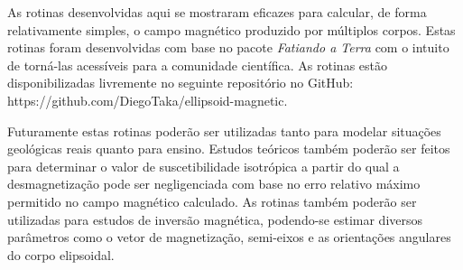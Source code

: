As rotinas desenvolvidas aqui se mostraram eficazes para calcular, de forma relativamente simples, o campo magnético produzido por múltiplos corpos. Estas rotinas foram desenvolvidas com base no pacote \textit{Fatiando a Terra} com o intuito de torná-las acessíveis para a comunidade científica. As rotinas estão disponibilizadas livremente no seguinte repositório no GitHub: https://github.com/DiegoTaka/ellipsoid-magnetic.

Futuramente estas rotinas poderão ser utilizadas tanto para modelar situações geológicas reais quanto para ensino. Estudos teóricos também poderão ser feitos para determinar o valor de suscetibilidade isotrópica a partir do qual a desmagnetização pode ser negligenciada com base no erro relativo máximo permitido no campo magnético calculado. As rotinas também poderão ser utilizadas para estudos de inversão magnética, podendo-se estimar diversos parâmetros como o vetor de magnetização, semi-eixos e as orientações angulares do corpo elipsoidal.

